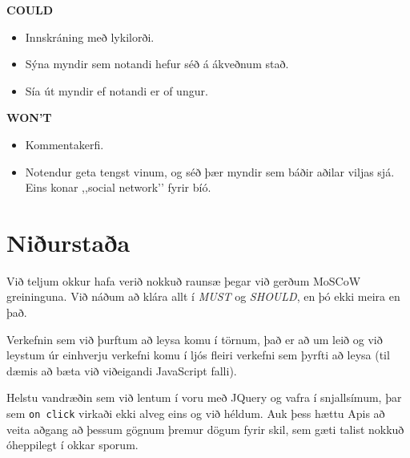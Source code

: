 \documentclass[a4paper,oneside]{article}
\begin{document}
\noindent\textbf{COULD}
\begin{itemize}
    \item Innskráning með lykilorði.
    \item Sýna myndir sem notandi hefur séð á ákveðnum stað.
    \item Sía út myndir ef notandi er of ungur.
\end{itemize}

\noindent\textbf{WON'T}
\begin{itemize}
    \item Kommentakerfi.
    \item Notendur geta tengst vinum, og séð þær myndir sem báðir aðilar viljas sjá.
        Eins konar ,,social network’’ fyrir bíó.
\end{itemize}

\section{Niðurstaða}
Við teljum okkur hafa verið nokkuð raunsæ þegar við gerðum MoSCoW greininguna. 
Við náðum að klára allt í \emph{MUST} og \emph{SHOULD}, en þó ekki meira en það. 

Verkefnin sem við þurftum að leysa komu í törnum, það er að um leið og við leystum
úr einhverju verkefni komu í ljós fleiri verkefni sem þyrfti að leysa
(til dæmis að bæta við viðeigandi JavaScript falli).

Helstu vandræðin sem við lentum í voru með JQuery og vafra í snjallsímum, þar sem
\texttt{on click} virkaði ekki alveg eins og við héldum. Auk þess hættu Apis að 
veita aðgang að þessum gögnum þremur dögum fyrir skil, sem gæti talist nokkuð óheppilegt
í okkar sporum. 
\end{document}
